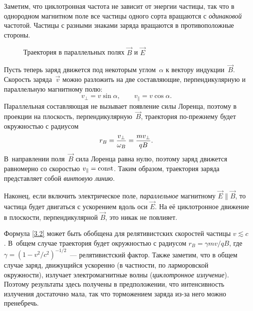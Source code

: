 Заметим, что циклотронная частота не зависит от энергии частицы, так
что в однородном магнитном поле все частицы одного сорта вращаются с
\emph{одинаковой} частотой. Частицы с разными знаками заряда вращаются в
противоположные стороны.

\begin{wrapfigure}{o}{0.25\textwidth}
\centering
 \caption{Траектория в параллельных полях $\vec{B}$ и $\vec{E}$}
\end{wrapfigure}

Пусть теперь заряд движется под некоторым углом~$\alpha$ к вектору
индукции~$\vec{B}$. Скорость заряда~$\vec{v}$ можно разложить
на две составляющие, перпендикулярную и параллельную магнитному полю:
\begin{equation*}
    v_{\perp}=v\sin\alpha,\qquad v_{\parallel}=v\cos\alpha.
\end{equation*}
Параллельная составляющая не вызывает появление силы Лоренца, поэтому
в проекции на плоскость, перпендикулярную~$\vec{B}$,
траектория по-прежнему будет окружностью с радиусом
\begin{equation}
    \eqmark{3.4}
    r_B = \frac{v_{\perp}}{\omega_B} = \frac{m v_{\perp}}{qB}.
\end{equation}
В~направлении поля~$\vec{B}$ сила Лоренца равна нулю, поэтому заряд движется
равномерно со скоростью $v_{\parallel}=\mathrm{const}$.
Таким образом, траектория заряда представляет собой \emph{винтовую линию}.

Наконец, если включить электрическое поле, \emph{параллельное}
магнитному $\vec{E}\parallel\vec{B}$, то частица будет двигаться с ускорением
вдоль оси $\vec{E}$. На её циклотронное движение в плоскости, перпендикулярной
$\vec{B}$, это никак не повлияет.

\begin{lab:note}
Формула \eqref{3.2} может быть обобщена для релятивистских скоростей частицы $v\lesssim c$. В~общем случае траектория будет окружностью с радиусом
$r_B = \gamma m v/qB$, где $\gamma = (1-v^2/c^2)^{-1/2}$~--- релятивистский фактор.
Также заметим, что в общем случае заряд, движущийся ускоренно (в частности,
по ларморовской окружности), излучает электромагнитные волны
(\emph{циклотронное излучение}). Поэтому результаты здесь получены в
предположении, что интенсивность излучения достаточно мала,
так что торможением заряда из-за него можно пренебречь.
\end{lab:note}



